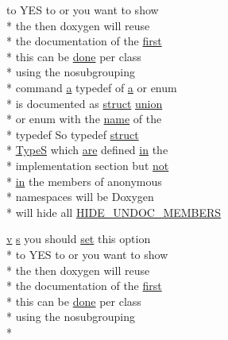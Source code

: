 \begin{DoxyCompactItemize}
to Y\-E\-S to or you want to show \\*
the then doxygen will reuse \\*
the documentation of the \hyperlink{glext_8h_a970a385f6f880f2b620451db4ca4299a}{first} \\*
this can be \hyperlink{qxtslotjob_8h_afd848a85523ad0ba77464879add9c332}{done} per class \\*
using the nosubgrouping \\*
command \hyperlink{glext_8h_ac8729153468b5dcf13f971b21d84d4e5}{a} typedef of \hyperlink{glext_8h_ac8729153468b5dcf13f971b21d84d4e5}{a} or enum \\*
is documented as \hyperlink{sdlgamepad_8dox_aba655c5729da86df745f0c8e7f9ba8d2}{struct} \hyperlink{sdlgamepad_8dox_a68000add3c95d09ceb97c3079515907d}{union} \\*
or enum with the \hyperlink{glext_8h_ad977737dfc9a274a62741b9500c49a32}{name} of the \\*
typedef So typedef \hyperlink{sdlgamepad_8dox_aba655c5729da86df745f0c8e7f9ba8d2}{struct} \\*
\hyperlink{sdlgamepad_8dox_a25dd1c015abaf1e4f2c6879012f4f170}{Type\-S} which \hyperlink{sdlgamepad_8dox_a6d0965b20c4eb2235e8f9f5f0e5193ae}{are} defined \hyperlink{glext_8h_a83ad0ee7f1e06b59c90271716e689080}{in} the \\*
implementation section but \hyperlink{uavobjecttemplate_8m_acf8758da9d0019183b0d213755711ee7}{not} \\*
\hyperlink{glext_8h_a83ad0ee7f1e06b59c90271716e689080}{in} the members of anonymous \\*
namespaces will be Doxygen \\*
will hide all \hyperlink{sdlgamepad_8dox_aa8c460aa75e1350ef6bebbac97c2aeff}{H\-I\-D\-E\-\_\-\-U\-N\-D\-O\-C\-\_\-\-M\-E\-M\-B\-E\-R\-S}
\item 
\hyperlink{glext_8h_a14cfbe2fc2234f5504618905b69d1e06}{v} \hyperlink{glext_8h_ad585a1393cfa368fa9dc3d8ebff640d5}{s} you should \hyperlink{analyze_raw_8m_a11671e12e7b3fc5881313758d6cc0b45}{set} this option \\*
to Y\-E\-S to or you want to show \\*
the then doxygen will reuse \\*
the documentation of the \hyperlink{glext_8h_a970a385f6f880f2b620451db4ca4299a}{first} \\*
this can be \hyperlink{qxtslotjob_8h_afd848a85523ad0ba77464879add9c332}{done} per class \\*
using the nosubgrouping \\*

\end{DoxyCompactItemize}
